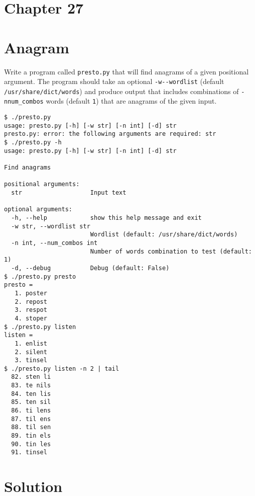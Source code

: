 \documentclass[]{article}
\begin{document}
\pagebreak

\hypertarget{chapter-27}{%
\section{Chapter 27}\label{chapter-27}}

\hypertarget{anagram}{%
\section{Anagram}\label{anagram}}

Write a program called \texttt{presto.py} that will find anagrams of a
given positional argument. The program should take an optional
\texttt{-w\textbar{}-\/-wordlist} (default
\texttt{/usr/share/dict/words}) and produce output that includes
combinations of \texttt{-n\textbar{}num\_combos} words (default
\texttt{1}) that are anagrams of the given input.

\begin{verbatim}
$ ./presto.py
usage: presto.py [-h] [-w str] [-n int] [-d] str
presto.py: error: the following arguments are required: str
$ ./presto.py -h
usage: presto.py [-h] [-w str] [-n int] [-d] str

Find anagrams

positional arguments:
  str                   Input text

optional arguments:
  -h, --help            show this help message and exit
  -w str, --wordlist str
                        Wordlist (default: /usr/share/dict/words)
  -n int, --num_combos int
                        Number of words combination to test (default: 1)
  -d, --debug           Debug (default: False)
$ ./presto.py presto
presto =
   1. poster
   2. repost
   3. respot
   4. stoper
$ ./presto.py listen
listen =
   1. enlist
   2. silent
   3. tinsel
$ ./presto.py listen -n 2 | tail
  82. sten li
  83. te nils
  84. ten lis
  85. ten sil
  86. ti lens
  87. til ens
  88. til sen
  89. tin els
  90. tin les
  91. tinsel
\end{verbatim}

\pagebreak

\hypertarget{solution-22}{%
\section{Solution}\label{solution-22}}
\end{document}
